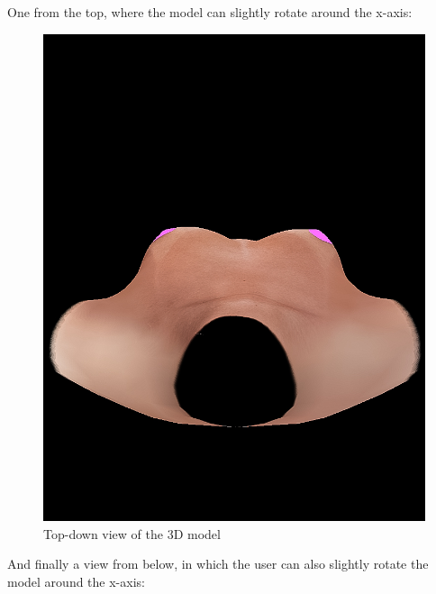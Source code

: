 One from the top, where the model can slightly rotate around the x-axis:

\begin{figure}[H]
    \centering
    \includegraphics{figures/20230529-top_view.jpg}
    \caption{Top-down view of the 3D model}
    \label{fig:top_view}
\end{figure}

And finally a view from below, in which the user can also slightly rotate the model around the x-axis:

